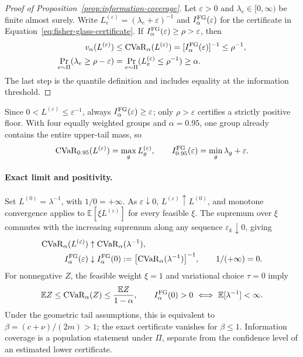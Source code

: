 \begin{proof}[Proof of Proposition~\ref{prop:information-coverage}]
Let $\varepsilon>0$ and $\lambda_e\in[0,\infty)$ be finite almost surely. Write $L_e^{(\varepsilon)}=(\lambda_e+\varepsilon)^{-1}$ and $I_\alpha^{\mathrm{FG}}(\varepsilon)$ for the certificate in Equation~\eqref{eq:fisher-glass-certificate}. If $I_\alpha^{\mathrm{FG}}(\varepsilon)\ge\rho>\varepsilon$, then
\begin{equation}
\begin{aligned}
v_\alpha(L^{(\varepsilon)})&\le\operatorname{CVaR}_\alpha(L^{(\varepsilon)})
=[I_\alpha^{\mathrm{FG}}(\varepsilon)]^{-1}\le\rho^{-1},\\
\Pr_{e\sim\Pi}(\lambda_e\ge\rho-\varepsilon)
&=\Pr_{e\sim\Pi}(L_e^{(\varepsilon)}\le\rho^{-1})\ge\alpha.
\end{aligned}
\label{eq:app-information-coverage}
\end{equation}
The last step is the quantile definition and includes equality at the information threshold.
\end{proof}
Since $0<L^{(\varepsilon)}\le\varepsilon^{-1}$, always $I_\alpha^{\mathrm{FG}}(\varepsilon)\ge\varepsilon$; only $\rho>\varepsilon$ certifies a strictly positive floor. With four equally weighted groups and $\alpha=0.95$, one group already contains the entire upper-tail mass, so
\begin{equation}
\operatorname{CVaR}_{0.95}(L^{(\varepsilon)})=\max_gL_g^{(\varepsilon)},
\qquad I_{0.95}^{\mathrm{FG}}(\varepsilon)=\min_g\lambda_g+\varepsilon.
\label{eq:app-four-group-certificate}
\end{equation}

\paragraph{Exact limit and positivity.}
Set $L^{(0)}=\lambda^{-1}$, with $1/0=+\infty$. As $\varepsilon\downarrow0$, $L^{(\varepsilon)}\uparrow L^{(0)}$, and monotone convergence applies to $\mathbb E[\xi L^{(\varepsilon)}]$ for every feasible $\xi$. The supremum over $\xi$ commutes with the increasing supremum along any sequence $\varepsilon_k\downarrow0$, giving
\begin{equation}
\begin{aligned}
\operatorname{CVaR}_\alpha(L^{(\varepsilon)})&\uparrow\operatorname{CVaR}_\alpha(\lambda^{-1}),\\
I_\alpha^{\mathrm{FG}}(\varepsilon)&\downarrow I_\alpha^{\mathrm{FG}}(0)
:=\bigl[\operatorname{CVaR}_\alpha(\lambda^{-1})\bigr]^{-1},\qquad 1/(+\infty)=0.
\end{aligned}
\label{eq:app-exact-limit}
\end{equation}
For nonnegative $Z$, the feasible weight $\xi=1$ and variational choice $\tau=0$ imply
\begin{equation}
\mathbb EZ\le\operatorname{CVaR}_\alpha(Z)\le\frac{\mathbb EZ}{1-\alpha},
\qquad I_\alpha^{\mathrm{FG}}(0)>0\ \Longleftrightarrow\ \mathbb E[\lambda^{-1}]<\infty.
\label{eq:app-cvar-mean-bounds}
\end{equation}
Under the geometric tail assumptions, this is equivalent to $\beta=(c+\nu)/(2m)>1$; the exact certificate vanishes for $\beta\le1$. Information coverage is a population statement under $\Pi$, separate from the confidence level of an estimated lower certificate.
